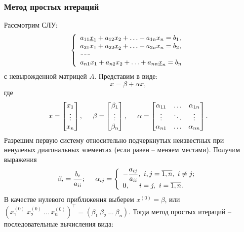 \begin{multicols}{2}
    \subsubsection*{Метод простых итераций}
    Рассмотрим СЛУ:
    \[
      \left\{
        \begin{array}{l}
            a_{11}\underline{x}_1 + a_{12}x_2 + \ldots + a_{1n}x_n = b_1,\\
            a_{21}x_1 + a_{22}\underline{x}_{2} + \ldots + a_{2n}x_n = b_2,\\
            \hdash\\
            a_{n1} x_1 + a_{n2}x_2 + \ldots + a_{nn}\underline{x}_n = b_n
        \end{array}
        \right.  
    \]
    с невырожденной матрицей $A$. Представим в виде:
    \[
        x = \beta + \alpha x,
    \]
    где 
    \[
        x = \begin{bmatrix}
            x_1 \\
            \vdots \\
            x_n
        \end{bmatrix}, \hspace*{0.5cm} \beta = \begin{bmatrix}
            \beta_1 \\
            \vdots\\
            \beta_n
        \end{bmatrix}, \hspace*{0.5cm} \alpha = \begin{bmatrix}
            \alpha_{11} & \ldots & \alpha_{1n}\\
            \vdots & \ddots & \vdots \\
            \alpha_{n1} & \ldots & \alpha_{nn}
        \end{bmatrix}.
    \]
    Разрешим первую систему относительно подчеркнутых неизвестных при ненулевых диагональных элементах (если равен -- меняем местами). Получим выражения 
    \[
        \beta_i = \dfrac{b_i}{a_{ii}}; \hspace*{0.5cm} \alpha_{ij} = \left\{ \begin{array}{l}
            -\dfrac{a_{ij}}{a_{ii}}, \ i, j = \overline{1, n}, \ i \neq j;\\
            0, \hspace*{0.5cm} i = j,\ i = \overline{1,n}.
        \end{array} \right.  
    \]
    В качестве нулевого приближения выберем $x^{(0)} = \beta$, или \mbox{$\left(x_1^{(0)}\ x_2^{(0)}\ \ldots \ x_n^{(0)}\right)^\intercal = (\beta_1\ \beta_2 \ \ldots \ \beta_n )$}. Тогда метод простых итераций -- последовательные вычисления вида:

\end{multicols}

